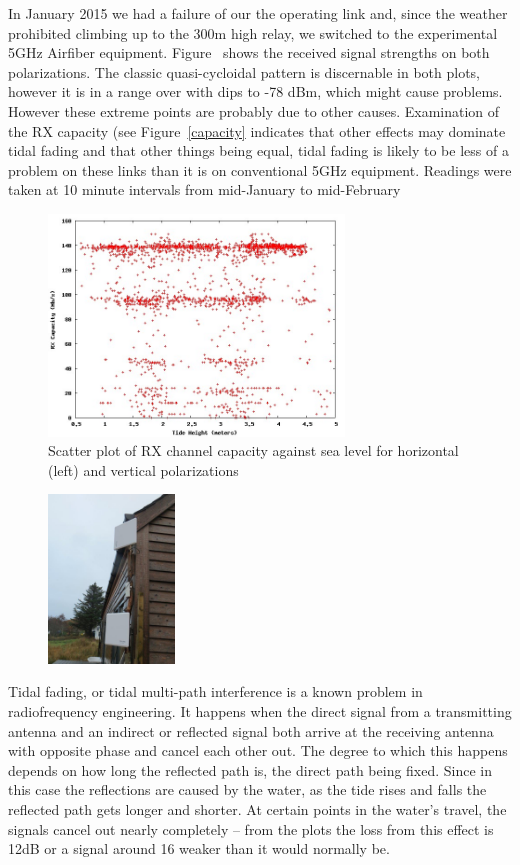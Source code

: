 In January 2015 we had a failure of our the operating link and, since
the weather prohibited climbing up to the 300m high relay, we switched
to the experimental 5GHz Airfiber equipment.
Figure~\label{fig:rxpower} shows the received signal strengths on both
polarizations.  The classic quasi-cycloidal pattern is discernable in
both plots, however it is in a range over with dips to -78 dBm, which
might cause problems.  However these extreme points are probably due
to other causes. Examination of the RX capacity (see
Figure~\ref{capacity} indicates that other effects may dominate tidal
fading and that other things being equal, tidal fading is likely to be
less of a problem on these links than it is on conventional 5GHz
equipment. Readings were taken at 10 minute intervals from mid-January
to mid-February
\begin{figure}
\includegraphics[width=0.7\textwidth]{tidedata/rxcapacity.jpg}
\caption{Scatter plot of RX channel capacity against sea level for
  horizontal (left) and vertical  polarizations}
\label{fig:capacity}
\end{figure}

\begin{figure}
  \includegraphics[width=0.3\textwidth]{tommy-diversity}
\end{figure}
Tidal fading, or tidal multi-path interference is a known problem in
radiofrequency engineering. It happens when the direct signal from
a transmitting antenna and an indirect or reflected signal both arrive at
the receiving antenna with opposite phase and cancel each other
out. The degree to which this happens depends on how long the
reflected path is, the direct path being fixed. Since in this case the
reflections are caused by the water, as the tide rises and falls the
reflected path gets longer and shorter. At certain points in the
water's travel, the signals cancel out nearly completely -- from the
plots the loss from this effect is 12dB or a signal around 16 weaker
than it would normally be.


